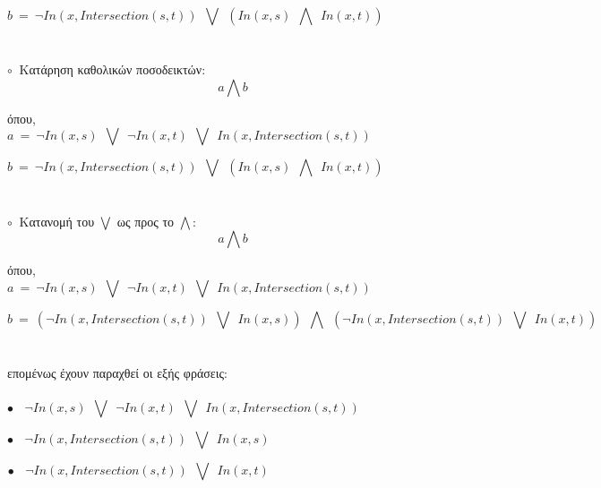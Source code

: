 \documentclass[10pt]{article}
\begin{document}
\[
b \ = \ \neg In( x, Intersection(s,t)) \ \ \bigvee  \ \ \left(  In(x,s) \ \ \bigwedge \ \ In(x,t)  \right ) \ \ \ \ \ \ \ \ \ \ \ \ \ \ \ \ \ \ \ \  \ \ \ \ \ \ \ \ \ \ \ \ \ \ \ \ \ \ \ \ \ \ \ \ \ \ \ \ 
\]\\ \\
 
$\circ \ $ Κατάρηση καθολικών ποσοδεικτών:
\[
a \bigwedge b  \]

όπου, \\
\[
a \ = \ \neg  In(x,s) \ \ \bigvee \ \  \neg In(x,t) \ \ \bigvee  \ \ In( x, Intersection(s,t)) \ \ \ \ \ \ \ \ \ \ \ \ \ \ \ \ \ \ \ \  \ \ \ \ \ \ \ \ \ \ \ \ \ \ \ \ \ \ \ \ \ \ \ \ \ \ \ \ 
\]

\[
b \ = \ \neg In( x, Intersection(s,t)) \ \ \bigvee  \ \ \left(  In(x,s) \ \ \bigwedge \ \ In(x,t)  \right ) \ \ \ \ \ \ \ \ \ \ \ \ \ \ \ \ \ \ \ \  \ \ \ \ \ \ \ \ \ \ \ \ \ \ \ \ \ \ \ \ \ \ \ \ \ \ \ \ 
\]\\ \\

$\circ \ $ Κατανομή του $\bigvee$ ως προς το $\bigwedge$:
\[
a \bigwedge b  \]

όπου, \\
\[
a \ = \ \neg  In(x,s) \ \ \bigvee \ \  \neg In(x,t) \ \ \bigvee  \ \ In( x, Intersection(s,t)) \ \ \ \ \ \ \ \ \ \ \ \ \ \ \ \ \ \ \ \  \ \ \ \ \ \ \ \ \ \ \ \ \ \ \ \ \ \ \ \ \ \ \ \ \ \ \ \ 
\]

\[
b \ = \ \left( \neg In( x, Intersection(s,t)) \ \ \bigvee \ \  In(x,s) \right) \ \ \bigwedge \ \ \left( \neg In( x, Intersection(s,t)) \ \ \bigvee \ \  In(x,t) \right)  \ \ \ \ \ \
\]\\ \\

επομένως έχουν παραχθεί οι εξής φράσεις: \\ \\

\[ \bullet \ \ \ \ 
 \neg  In(x,s) \ \ \bigvee \ \  \neg In(x,t) \ \ \bigvee  \ \ In( x, Intersection(s,t)) \ \ \ \ \ \ \ \ \ \ \ \ \ \ \ \ \ \ \ \  \ \ \ \ \ \ \ \ \ \ \ \ \ \ \ \ \ \ \ \ \ \ \ \ \ \ \ \ 
\]

\[ \bullet \ \ \ \ 
 \neg In( x, Intersection(s,t)) \ \ \bigvee \ \  In(x,s)\ \ \ \ \ \ \ \ \ \ \ \ \ \ \ \ \ \ \ \ \ \ \ \ \ \  \ \ \ \ \ \ \ \ \ \ \ \ \ \ \ \ \ \ \ \ \ \ \ \ \ \ \ \ \ \ \ \ \ \ \ \ \ \ \ \ \ \ 
\]

\[ \bullet \ \ \ \ 
\neg In( x, Intersection(s,t)) \ \ \bigvee \ \  In(x,t) \ \ \ \ \ \ \ \ \ \ \ \ \ \ \ \ \ \ \ \ \ \ \ \ \ \  \ \ \ \ \ \ \ \ \ \ \ \ \ \ \ \ \ \ \ \ \ \ \ \ \ \ \ \ \ \ \ \ \ \ \ \ \ \ \ \ \ \ 
\]\\ \\
\end{document}
